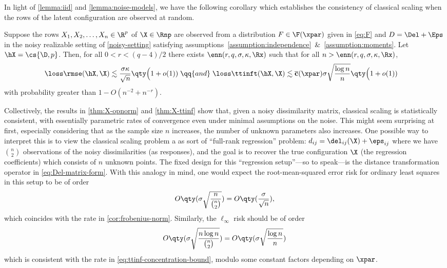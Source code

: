 \documentclass[10pt]{article}
\begin{document}
    In light of \cref{lemma:iid} and \cref{lemma:noise-models}, we have the following corollary which establishes the consistency of classical scaling when the rows of the latent configuration are observed \iid{} at random.

\begin{corollary}\label{cor:iid}
    Suppose the rows $X_1, X_2, \dots, X_n \in \R^p$ of $\X \in \Rnp$ are observed \iid{} from a distribution $F \in \F(\xpar)$ given in \cref{eq:F} and $D = \Del + \Eps$ in the noisy realizable setting of \cref{noisy-setting} satisfying assumptions~\ref{assumption:independence}~\&~\ref{assumption:moments}. Let $\hX = \cs{\D, p}$. Then, for all $0 < r < (q-4)/2$ there exists $\enn(r, q, \sigma, \kappa, \Rx)$ such that for all $n > \enn(r, q, \sigma, \kappa, \Rx)$,
    \begin{align}
        \loss\rmse(\hX, \X) &\lesssim \frac{\sigma\kappa}{\sqrt{n}} \qty\Big(1 + o(1)) \;\qq{and}\; \loss\ttinft(\hX, \X) \lesssim {\mathbf{\overline{c}}(\xpar)} \sigma\sqrt{\frac{\log{n}}{n}} \qty\Big( 1 + o(1) )\label{eq:iid-convergence}
    \end{align}
    with probability greater than $1 - O(n^{-2} + n^{-r})$.
\end{corollary}

Collectively, the results in \cref{thm:X-opnorm} and \cref{thm:X-ttinf} show that, given a noisy dissimilarity matrix, classical scaling is statistically consistent, with essentially parametric rates of convergence even under minimal assumptions on the noise. This might seem surprising at first, especially considering that as the sample size $n$ increases, the number of unknown parameters also increases. One possible way to interpret this is to view the classical scaling problem a as sort of ``full-rank regression'' problem: $d_{ij} = \del_{ij}(\X) + \eps_{ij}$ where we have ${n \choose 2}$ observations of the noisy dissimilarities (as responses), and the goal is to recover the true configuration $\X$ (the regression coefficients) which consists of $n$ unknown points. The fixed design for this ``regression setup''---so to speak---is the distance transformation operator in \cref{eq:Del-matrix-form}. With this analogy in mind, one would expect the root-mean-squared error risk for ordinary least squares in this setup to be of order 
$$
O\qty(\sigma \sqrt{\frac{n}{{n \choose 2}}}) = O\qty( {\frac{\sigma}{\sqrt{n}}}),
$$ 
which coincides with the rate in \cref{cor:frobenius-norm}. Similarly, the $\ell_\infty$ risk should be of order 
$$
O\qty(\sigma \sqrt{ \frac{{n}\log{n}}{{n \choose 2}} }) = O\qty(\sigma  \sqrt{\frac{\log{n}}{n}})
$$ 
which is consistent with the rate in \cref{eq:ttinf-concentration-bound}, modulo some constant factors depending on $\xpar$.
\end{document}

